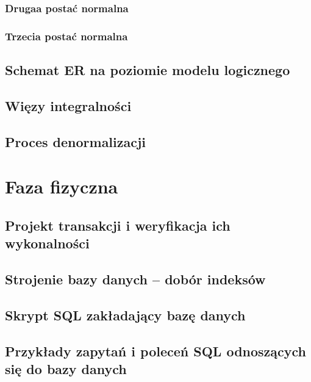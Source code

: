 \documentclass{mwrep}[15pt]
\begin{document}
\subsection{Drugaa postać normalna}
\subsection{Trzecia postać normalna}


\section{Schemat ER na poziomie modelu logicznego}

\section{Więzy integralności}

\section{Proces denormalizacji}

\chapter{Faza fizyczna}

\section{Projekt transakcji i weryfikacja ich wykonalności}

\section{Strojenie bazy danych – dobór indeksów}

\section{Skrypt SQL zakładający bazę danych}

\section{Przykłady zapytań i poleceń SQL odnoszących się do bazy danych}
\end{document}
